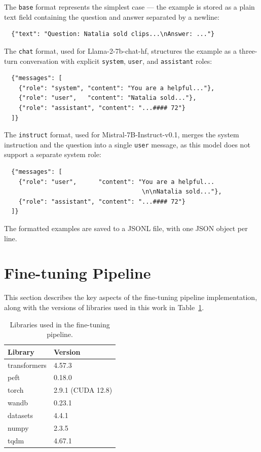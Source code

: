   The \texttt{base} format represents the simplest
  case --- the example is stored as a plain text field
  containing the question and answer separated by a
  newline:

  \begin{lstlisting}
  {"text": "Question: Natalia sold clips...\nAnswer: ..."}
  \end{lstlisting}

  The \texttt{chat} format, used for Llama-2-7b-chat-hf,
  structures the example as a three-turn conversation
  with explicit \texttt{system}, \texttt{user}, and
  \texttt{assistant} roles:

  \begin{lstlisting}
  {"messages": [
    {"role": "system", "content": "You are a helpful..."},
    {"role": "user",   "content": "Natalia sold..."},
    {"role": "assistant", "content": "...#### 72"}
  ]}
  \end{lstlisting}

  The \texttt{instruct} format, used for
  Mistral-7B-Instruct-v0.1, merges the system
  instruction and the question into a single
  \texttt{user} message, as this model does not
  support a separate system role:

  \begin{lstlisting}
  {"messages": [
    {"role": "user",      "content": "You are a helpful...
                                      \n\nNatalia sold..."},
    {"role": "assistant", "content": "...#### 72"}
  ]}
  \end{lstlisting}

  The formatted examples are saved to a JSONL file,
  with one JSON object per line.

\section{Fine-tuning Pipeline}
\label{sec:finetuning-pipeline}
This section describes the key aspects of the
  fine-tuning pipeline implementation, along with
  the versions of libraries used in this work in Table~\ref{tab:libraries}.

  \begin{table}[ht]
  \caption{Libraries used in the fine-tuning
  pipeline.}
  \centering
  \begin{tabular}{ll}
  \toprule
  \textbf{Library} & \textbf{Version} \\
  \midrule
  transformers & 4.57.3 \\
  peft & 0.18.0 \\
  torch & 2.9.1 (CUDA 12.8) \\
  wandb & 0.23.1 \\
  datasets & 4.4.1 \\
  numpy & 2.3.5 \\
  tqdm & 4.67.1 \\
  \bottomrule
  \end{tabular}
  \label{tab:libraries}
  \end{table}

